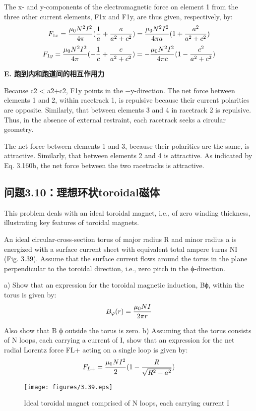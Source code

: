The x- and y-components of the electromagnetic force on element 1 from the three
other current elements, F1x and F1y, are thus given, respectively, by:
$$
F_{1x}=\frac{\mu_{0}N^{2}I^{2}}{4\pi}(\frac{1}{a}+\frac{a}{a^{2}+c^{2}})=\frac{\mu_{0}N^{2}I^{2}}{4\pi a}(1+\frac{a^{2}}{a^{2}+c^{2}})\\%
$$
$$
F_{1y}=\frac{\mu_{0}N^{2}I^{2}}{4\pi}(-\frac{1}{c}+\frac{c}{a^{2}+c^{2}})=-\frac{\mu_{0}N^{2}I^{2}}{4\pi c}(1-\frac{c^{2}}{a^{2}+c^{2}})\\%
$$

\textbf{E. 跑到内和跑道间的相互作用力}

Because c2 < a2+c2, F1y points in the −y-direction. The net force between elements 1 and 2, within racetrack 1, is repulsive because their current polarities
are opposite. Similarly, that between elements 3 and 4 in racetrack 2 is repulsive.
Thus, in the absence of external restraint, each racetrack seeks a circular geometry.

The net force between elements 1 and 3, because their polarities are the same, is
attractive. Similarly, that between elements 2 and 4 is attractive. As indicated by
Eq. 3.160b, the net force between the two racetracks is attractive.

\newpage


\subsection{问题3.10：理想环状toroidal磁体}
This problem deals with an ideal toroidal magnet, i.e., of zero winding thickness,
illustrating key features of toroidal magnets.

An ideal circular-cross-section torus of major radius R and minor radius a is
energized with a surface current sheet with equivalent total ampere turns NI
(Fig. 3.39). Assume that the surface current flows around the torus in the plane
perpendicular to the toroidal direction, i.e., zero pitch in the ϕ-direction.

a) Show that an expression for the toroidal magnetic induction, Bϕ, within the
torus is given by:
$$
B_{\varphi}(r)=\frac{\mu_{0}NI}{2\pi r}\\%
$$

Also show that B
ϕ outside the torus is zero.
b) Assuming that the torus consists of N loops, each carrying a current of I,
show that an expression for the net radial Lorentz force FL+ acting on a
single loop is given by:
$$
F_{L+}=\frac{\mu_{0}NI^{2}}{2}(1-\frac{R}{\sqrt{R^{2}-a^{2}}})\\%
$$
\begin{figure}[htbp]
	\centering
	\texttt{[image: figures/3.39.eps]}
	\caption{Ideal toroidal magnet comprised of N loops, each carrying current I}
\end{figure}


